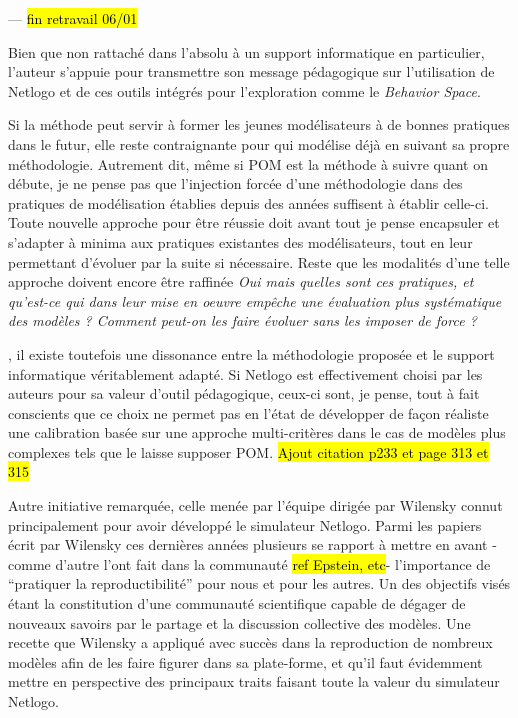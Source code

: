 --- \hl{fin retravail 06/01}

Bien que non rattaché dans l'absolu à un support informatique en particulier, l'auteur s'appuie pour transmettre son message pédagogique sur l'utilisation de Netlogo et de ces outils intégrés pour l'exploration comme le \textit{Behavior Space}.

Si la méthode peut servir à former les jeunes modélisateurs à de bonnes pratiques dans le futur, elle reste contraignante pour qui modélise déjà en suivant sa propre méthodologie. Autrement dit, même si POM est la méthode à suivre quant on débute, je ne pense pas que l'injection forcée d'une méthodologie dans des pratiques de modélisation établies depuis des années suffisent à établir celle-ci. Toute nouvelle approche pour être réussie doit avant tout je pense encapsuler et s'adapter à minima aux pratiques existantes des modélisateurs, tout en leur permettant d'évoluer par la suite si nécessaire. Reste que les modalités d'une telle approche doivent encore être raffinée \textit{Oui mais quelles sont ces pratiques, et qu'est-ce qui dans leur mise en oeuvre empêche une évaluation plus systématique des modèles ? Comment peut-on les faire évoluer sans les imposer de force ?}

, il existe toutefois une dissonance entre la méthodologie proposée et le support informatique véritablement adapté. Si Netlogo est effectivement choisi par les auteurs pour sa valeur d'outil pédagogique, ceux-ci sont, je pense, tout à fait conscients que ce choix ne permet pas en l'état de développer de façon réaliste une calibration basée sur une approche multi-critères dans le cas de modèles plus complexes tels que le laisse supposer POM. \hl{Ajout citation p233 et page 313 et 315}

Autre initiative remarquée, celle menée par l'équipe dirigée par Wilensky connut principalement pour avoir développé le simulateur Netlogo. Parmi les papiers écrit par Wilensky ces dernières années \autocite{Wilensky2007a} plusieurs se rapport à mettre en avant - comme d'autre l'ont fait dans la communauté \hl{ref Epstein, etc}- l'importance de \enquote{pratiquer la reproductibilité} pour nous et pour les autres. Un des objectifs visés étant la constitution d'une communauté scientifique capable de dégager de nouveaux savoirs par le partage et la discussion collective des modèles. Une recette que Wilensky a appliqué avec succès dans la reproduction de nombreux modèles afin de les faire figurer dans sa plate-forme, et qu'il faut évidemment mettre en perspective des principaux traits faisant toute la valeur du simulateur Netlogo. 


